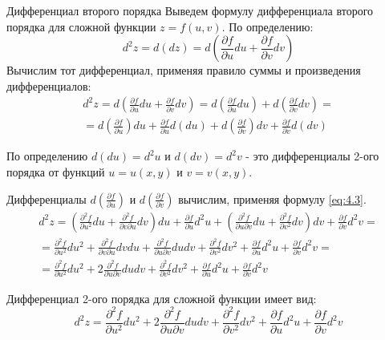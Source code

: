 \begin{tbox}{Дифференциал второго порядка}
	Выведем формулу дифференциала второго порядка для сложной функции $z = f(u,v)$. По определению:
	\begin{equation*}
		d^2 z = d(dz) = d(\frac{\partial f}{\partial u} du + \frac{\partial f}{\partial v} dv)
	\end{equation*}
	Вычислим тот дифференциал, применяя правило суммы и произведения дифференциалов:
	\begin{multline} \label{eq:4.4}
		d^2 z = d\left(\frac{\partial f}{\partial u} du + \frac{\partial f}{\partial v} dv\right) = d\left(\frac{\partial f}{\partial u} du\right) + d\left(\frac{\partial f}{\partial v} dv\right) =\\=  d\left(\frac{\partial f}{\partial u}\right) du + \frac{\partial f}{\partial u} d\left(du\right) + d\left(\frac{\partial f}{\partial v}\right) dv + \frac{\partial f}{\partial v} d(dv)
	\end{multline}

	По определению $d(du) = d^2 u$ и $d(dv) = d^2 v$ - это дифференциалы 2-ого порядка от функций $u = u(x,y)$ и $v = v(x,y)$.

	Дифференциалы $d\left(\frac{\partial f}{\partial u}\right)$ и $d\left(\frac{\partial f}{\partial v}\right)$ вычислим, применяя формулу \cref{eq:4.3}.
	\begin{multline*}
		d^2 z = \left(\frac{\partial^2 f}{\partial u^2} du + \frac{\partial^2 f}{\partial v \partial u} dv\right) du + \frac{\partial f}{\partial u} d^2 u + \left(\frac{\partial^2 f}{\partial u \partial v} du + \frac{\partial ^2 f}{\partial v^2}dv\right)dv + \frac{\partial f}{\partial v} d^2 v = \\
		= \frac{\partial^2 f}{\partial u^2} du^2 + \frac{\partial^2 f}{\partial v \partial u} dv du + \frac{\partial^2 f}{\partial u \partial v} du dv + \frac{\partial^2 f}{\partial v^2} dv^2 + \frac{\partial f}{\partial u} d^2 u + \frac{\partial f}{\partial v} d^2 v = \\
		= \frac{\partial^2 f}{\partial u^2} du^2 + 2 \frac{\partial^2 f}{\partial u \partial v} du dv + \frac{\partial^2 f}{\partial v^2} dv^2 + \frac{\partial f}{\partial u} d^2 u + \frac{\partial f}{\partial v} d^2 v
	\end{multline*}

	Дифференциал 2-ого порядка для сложной функции имеет вид:
	\begin{equation} \label{eq:4.5}
		\boxed{d^2 z = \frac{\partial^2 f}{\partial u^2} du^2 + 2 \frac{\partial^2 f}{\partial u \partial v} du dv + \frac{\partial^2 f}{\partial v^2} dv^2 + \frac{\partial f}{\partial u} d^2 u + \frac{\partial f}{\partial v} d^2 v}
	\end{equation}
\end{tbox}

